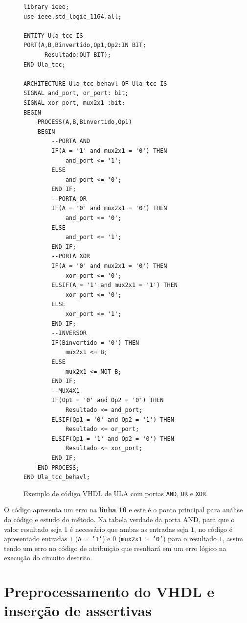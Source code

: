 \begin{figure}[H]
\caption{\label{fig:code_exemplo} Exemplo de código VHDL de ULA com portas \texttt{AND}, \texttt{OR} e \texttt{XOR}.}
	\begin{center}
    \begin{minipage}{0.7\textwidth}
    \begin{lstlisting}       
library ieee;
use ieee.std_logic_1164.all;

ENTITY Ula_tcc IS
PORT(A,B,Binvertido,Op1,Op2:IN BIT;
	  Resultado:OUT BIT);
END Ula_tcc;

ARCHITECTURE Ula_tcc_behavl OF Ula_tcc IS
SIGNAL and_port, or_port: bit;
SIGNAL xor_port, mux2x1 :bit;
BEGIN
	PROCESS(A,B,Binvertido,Op1)
	BEGIN
		--PORTA AND
		IF(A = '1' and mux2x1 = '0') THEN
		    and_port <= '1';
		ELSE
		    and_port <= '0';
		END IF;
		--PORTA OR
		IF(A = '0' and mux2x1 = '0') THEN
		    and_port <= '0';
		ELSE
		    and_port <= '1';
		END IF;
		--PORTA XOR
		IF(A = '0' and mux2x1 = '0') THEN
		    xor_port <= '0';
		ELSIF(A = '1' and mux2x1 = '1') THEN
		    xor_port <= '0';
		ELSE
		    xor_port <= '1';
		END IF;
		--INVERSOR
		IF(Binvertido = '0') THEN
			mux2x1 <= B;
		ELSE
			mux2x1 <= NOT B;
		END IF;
		--MUX4X1
		IF(Op1 = '0' and Op2 = '0') THEN
			Resultado <= and_port;
		ELSIF(Op1 = '0' and Op2 = '1') THEN
			Resultado <= or_port;
		ELSIF(Op1 = '1' and Op2 = '0') THEN
			Resultado <= xor_port;
		END IF;
	END PROCESS;
END Ula_tcc_behavl;
    \end{lstlisting}
    \end{minipage}
	\end{center}
\end{figure}

O código apresenta um erro na \textbf{linha 16} e este é o ponto principal para análise do código e estudo do método. Na tabela verdade da porta AND, para que o valor resultado seja $1$ é necessário que ambas as entradas seja $1$, no código é apresentado entradas $1$ (\texttt{A = '1'}) e $0$ (\texttt{mux2x1 = '0'}) para o resultado $1$, assim tendo um erro no código de atribuição que resultará em um erro lógico na execução do circuito descrito.

\section{Preprocessamento do VHDL e inserção de assertivas}
\label{cap:vhdl_assertivas}

